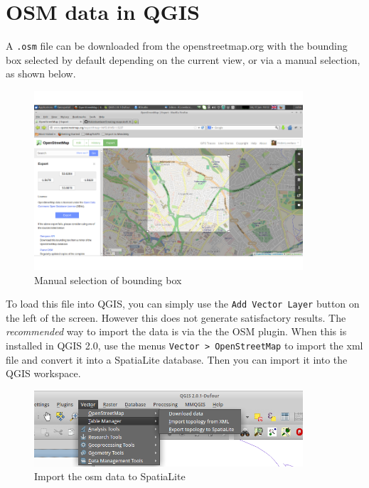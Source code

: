 \documentclass[]{article}
\let\Oldincludegraphics\includegraphics
\renewcommand{\includegraphics}[1]{\Oldincludegraphics[width=10cm]{#1}}
\begin{document}
\section{OSM data in QGIS}

A \texttt{.osm} file can be downloaded from the openstreetmap.org with
the bounding box selected by default depending on the current view, or
via a manual selection, as shown below.

\begin{figure}[htbp]
\centering
\includegraphics{figure/Manual_selection_of_bounding_box.png}
\caption{Manual selection of bounding box}
\end{figure}

To load this file into QGIS, you can simply use the
\texttt{Add Vector Layer} button on the left of the screen. However this
does not generate satisfactory results. The \emph{recommended} way to
import the data is via the the OSM plugin. When this is installed in
QGIS 2.0, use the menus \texttt{Vector \textgreater{} OpenStreetMap} to
import the xml file and convert it into a SpatiaLite database. Then you
can import it into the QGIS workspace.

\begin{figure}[htbp]
\centering
\includegraphics{osmfigs/import-osm.png}
\caption{Import the osm data to SpatiaLite}
\end{figure}
\end{document}
